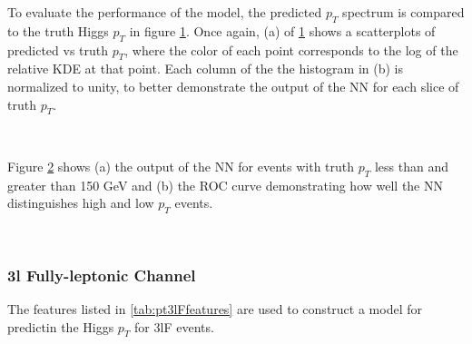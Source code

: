 To evaluate the performance of the model, the predicted $p_T$ spectrum is compared to the truth Higgs $p_T$ in figure \ref{fig:pt3lSresults}. Once again, (a) of \ref{fig:pt3lSresults} shows a scatterplots of predicted vs truth $p_T$, where the color of each point corresponds to the log of the relative KDE at that point. Each column of the the histogram in (b) is normalized to unity, to better demonstrate the output of the NN for each slice of truth $p_T$.
                                                                                                                             
\begin{figure}[h!]
    \\                     
    \caption{}
    \label{fig:pt3lSresults}
\end{figure}

Figure \ref{fig:pt3lSroc} shows (a) the output of the NN for events with truth $p_T$ less than and greater than 150 GeV and (b) the ROC curve demonstrating how well the NN distinguishes high and low $p_T$ events. 

\begin{figure}[h!]                                                                                                           
    \\
    \caption{}
    \label{fig:pt3lSroc}
\end{figure}


\subsubsection{3l Fully-leptonic Channel}
\label{subsec:pt3lF}

The features listed in \ref{tab:pt3lFfeatures} are used to construct a model for predictin the Higgs $p_T$ for 3lF events.


